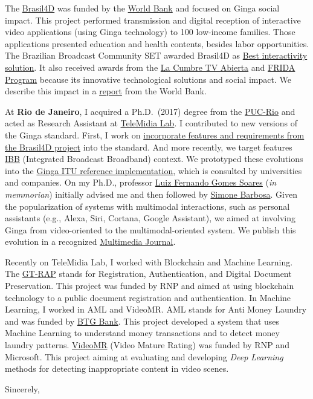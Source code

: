 \documentclass[10pt,a4paper,sans,colorlinks]{moderncv}
\begin{document}
The \href{http://www.ebc.com.br/brasil-4d}{Brasil4D} was funded by the \href{https://www.worldbank.org/}{World Bank} and focused on Ginga social impact.
This project performed transmission and digital reception of interactive video applications (using Ginga technology) to 100 low-income families.
Those applications presented education and health contents, besides labor opportunities.
The Brazilian Broadcast Community SET awarded Brasil4D as \href{http://set.org.br/artigos/ed137/137_revistadaset_70.pdf}{Best interactivity solution}.
It also received awards from the \href{https://www.premiotv.com/es/ganadores-es/ganadores-2013-es}{La Cumbre TV Abierta} and \href{https://programafrida.net/archivos/project/brasil-4d}{FRIDA Program} because its innovative technological solutions and social impact.
We describe this impact in a  \href{http://documents.worldbank.org/curated/en/232621468230956108/pdf/809560WP0PORTU0Box0379824B00PUBLIC0.pdf}{report} from the World Bank.

At \textbf{Rio de Janeiro}, I acquired a Ph.D.~(2017) degree from the \href{http://www.inf.puc-rio.br/}{PUC-Rio} and acted as Research Assistant at \href{http://telemidia.puc-rio.br/}{TeleMidia Lab}.
I contributed to new versions of the Ginga standard.
First, I work on \href{https://www.abntcatalogo.com.br/norma.aspx?
  ID=361857#}{incorporate features and requirements from the Brasil4D project} into the standard.
And more recently, we target features \href{http://www.freepatentsonline.com/y2016/0234533.html}{IBB} (Integrated Broadcast Broadband) context.
We prototyped these evolutions into the  \href{https://github.com/TeleMidia/ginga}{Ginga ITU reference implementation}, which is consulted by universities and companies.
On my Ph.D., professor \href{https://www.researchgate.net/profile/Luiz_Fernando_Soares}{Luiz Fernando Gomes Soares} (\textit{in memmorian}) initially advised me and then followed by  \href{https://www.linkedin.com/in/simonedjb/}{Simone Barbosa}.
Given the popularization of systems with multimodal interactions, such as personal assistants (e.g., Alexa, Siri, Cortana, Google Assistant), we aimed at involving Ginga from video-oriented to the multimodal-oriented system.
We publish this evolution in a recognized \href{https://link.springer.com/article/10.1007\%2Fs11042-016-3846-8}{Multimedia Journal}.

Recently on TeleMidia Lab, I worked with Blockchain and Machine Learning.
The \href{http://wrnp.rnp.br/sites/wrnp2017/files/02_wrnp2017_poster_gt-sap_design.pdf}{GT-RAP} stands for Registration, Authentication, and Digital Document Preservation.
This project was funded by RNP and aimed at using blockchain technology to a public document registration and authentication.
In Machine Learning, I worked in AML and VideoMR.
AML stands for Anti Money Laundry and was funded by \href{https://www.btgpactual.com/}{BTG
Bank}.
This project developed a system that uses Machine Learning to understand money transactions and to detect money laundry patterns.
\href{https://www.rnp.br/en/rnp-and-microsoft-challenge-artificial-intelligence}{VideoMR} (Video Mature Rating) was funded by RNP and Microsoft.
This project aiming at evaluating and developing \textit{Deep Learning} methods for detecting inappropriate content in video scenes.

\vspace{1em}
\raggedright
Sincerely, \myname
\end{document}
